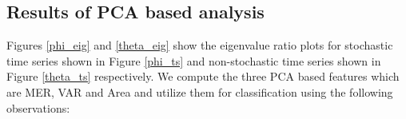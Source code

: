 \documentclass[journal]{IEEEtran}
\begin{document}





\subsection{Results of PCA based analysis}

%

Figures \ref{phi_eig} and \ref{theta_eig} show the eigenvalue ratio plots for stochastic time series shown in Figure \ref{phi_ts} and  non-stochastic time series shown in Figure \ref{theta_ts} respectively. We compute the three PCA based features which are MER, VAR and Area  and utilize them for classification using the following observations:
\end{document}
